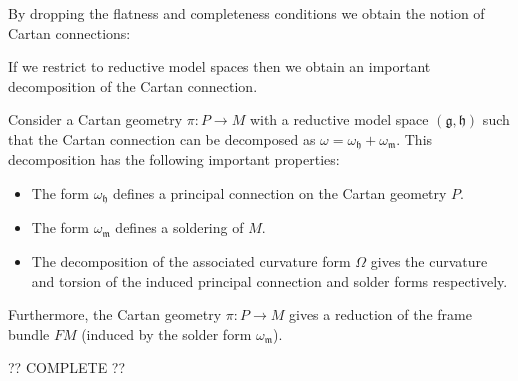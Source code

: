     By dropping the flatness and completeness conditions we obtain the notion of Cartan connections:

    If we restrict to reductive model spaces then we obtain an important decomposition of the Cartan connection.
    \begin{property}
        Consider a Cartan geometry $\pi:P\rightarrow M$ with a reductive model space $(\mathfrak{g}, \mathfrak{h})$ such that the Cartan connection can be decomposed as $\omega=\omega_{\mathfrak{h}}+\omega_{\mathfrak{m}}$. This decomposition has the following important properties:
        \begin{itemize}
            \item The form $\omega_{\mathfrak{h}}$ defines a principal connection on the Cartan geometry $P$.
            \item The form $\omega_{\mathfrak{m}}$ defines a soldering of $M$.
            \item The decomposition of the associated curvature form $\Omega$ gives the curvature and torsion of the induced principal connection and solder forms respectively.
        \end{itemize}
        Furthermore, the Cartan geometry $\pi:P\rightarrow M$ gives a reduction of the frame bundle $FM$ (induced by the solder form $\omega_{\mathfrak{m}}$).
    \end{property}
    ?? COMPLETE ??
